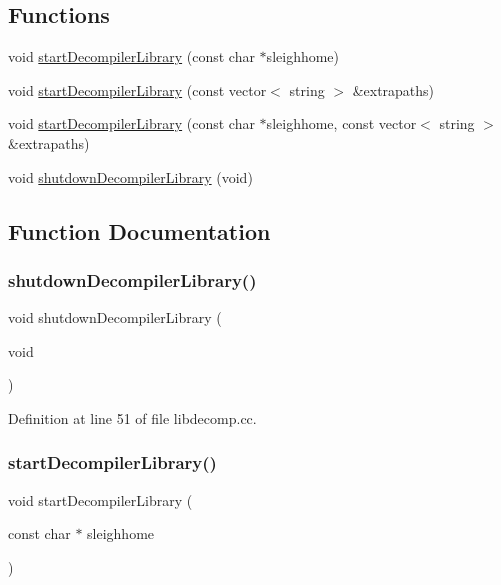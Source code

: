 \subsection*{Functions}
\begin{DoxyCompactItemize}
\item 
void \mbox{\hyperlink{libdecomp_8hh_acfd4067a6eec02a6fe97d05439b7e176}{start\+Decompiler\+Library}} (const char $\ast$sleighhome)
\item 
void \mbox{\hyperlink{libdecomp_8hh_a3bca24bcfcd70f728dcd33e26fb23240}{start\+Decompiler\+Library}} (const vector$<$ string $>$ \&extrapaths)
\item 
void \mbox{\hyperlink{libdecomp_8hh_ac9748283f19f6d8692e4d806a3cf267e}{start\+Decompiler\+Library}} (const char $\ast$sleighhome, const vector$<$ string $>$ \&extrapaths)
\item 
void \mbox{\hyperlink{libdecomp_8hh_ac2fdf7ba1dc532a8ce871e31a40461be}{shutdown\+Decompiler\+Library}} (void)
\end{DoxyCompactItemize}


\subsection{Function Documentation}
\mbox{\label{libdecomp_8hh_ac2fdf7ba1dc532a8ce871e31a40461be}} 
\subsubsection{\texorpdfstring{shutdownDecompilerLibrary()}{shutdownDecompilerLibrary()}}
{\footnotesize\ttfamily void shutdown\+Decompiler\+Library (\begin{DoxyParamCaption}\item[{void}]{ }\end{DoxyParamCaption})}



Definition at line 51 of file libdecomp.\+cc.

\mbox{\label{libdecomp_8hh_acfd4067a6eec02a6fe97d05439b7e176}} 
\subsubsection{\texorpdfstring{startDecompilerLibrary()}{startDecompilerLibrary()}\hspace{0.1cm}{\footnotesize\ttfamily [1/3]}}
{\footnotesize\ttfamily void start\+Decompiler\+Library (\begin{DoxyParamCaption}\item[{const char $\ast$}]{sleighhome }\end{DoxyParamCaption})}



